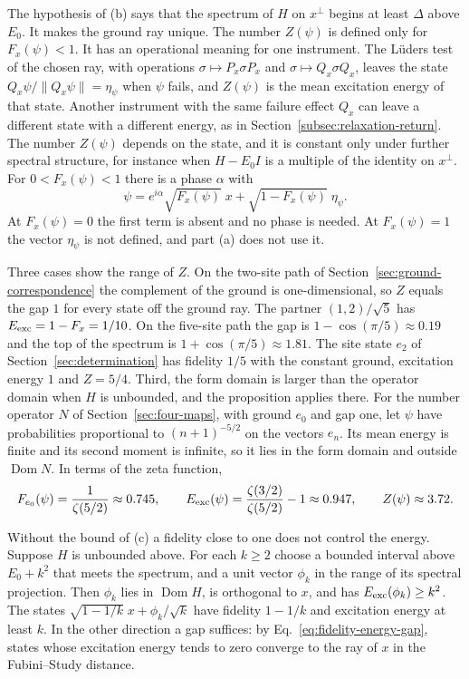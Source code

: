 \documentclass[11pt]{article}
\theoremstyle{definition}
\begin{document}
The hypothesis of (b) says that the spectrum of $H$ on $x^\perp$ begins at least $\Delta$ above $E_0$. It makes the ground ray unique. The number $Z(\psi)$ is defined only for $F_x(\psi)<1$. It has an operational meaning for one instrument. The L\"uders test of the chosen ray, with operations $\sigma\mapsto P_x\sigma P_x$ and $\sigma\mapsto Q_x\sigma Q_x$, leaves the state $Q_x\psi/\|Q_x\psi\|=\eta_\psi$ when $\psi$ fails, and $Z(\psi)$ is the mean excitation energy of that state. Another instrument with the same failure effect $Q_x$ can leave a different state with a different energy, as in Section~\ref{subsec:relaxation-return}. The number $Z(\psi)$ depends on the state, and it is constant only under further spectral structure, for instance when $H-E_0I$ is a multiple of the identity on $x^\perp$. For $0<F_x(\psi)<1$ there is a phase $\alpha$ with
\begin{equation}
 \psi=e^{i\alpha}\sqrt{F_x(\psi)}\;x+\sqrt{1-F_x(\psi)}\;\eta_\psi .
 \label{eq:fidelity-energy-decomposition}
\end{equation}
At $F_x(\psi)=0$ the first term is absent and no phase is needed. At $F_x(\psi)=1$ the vector $\eta_\psi$ is not defined, and part (a) does not use it.

Three cases show the range of $Z$. On the two-site path of Section~\ref{sec:ground-correspondence} the complement of the ground is one-dimensional, so $Z$ equals the gap $1$ for every state off the ground ray. The partner $(1,2)/\sqrt5$ has $E_{\rm exc}=1-F_x=1/10$. On the five-site path the gap is $1-\cos(\pi/5)\approx0.19$ and the top of the spectrum is $1+\cos(\pi/5)\approx1.81$. The site state $e_2$ of Section~\ref{sec:determination} has fidelity $1/5$ with the constant ground, excitation energy $1$ and $Z=5/4$. Third, the form domain is larger than the operator domain when $H$ is unbounded, and the proposition applies there. For the number operator $N$ of Section~\ref{sec:four-maps}, with ground $e_0$ and gap one, let $\psi$ have probabilities proportional to $(n+1)^{-5/2}$ on the vectors $e_n$. Its mean energy is finite and its second moment is infinite, so it lies in the form domain and outside $\operatorname{Dom}N$. In terms of the zeta function,
\begin{equation}
 F_{e_0}(\psi)=\frac1{\zeta(5/2)}\approx0.745,\qquad
 E_{\rm exc}(\psi)=\frac{\zeta(3/2)}{\zeta(5/2)}-1\approx0.947,\qquad Z(\psi)\approx3.72 .
 \label{eq:fidelity-energy-oscillator}
\end{equation}

Without the bound of (c) a fidelity close to one does not control the energy. Suppose $H$ is unbounded above. For each $k\ge2$ choose a bounded interval above $E_0+k^2$ that meets the spectrum, and a unit vector $\phi_k$ in the range of its spectral projection. Then $\phi_k$ lies in $\operatorname{Dom}H$, is orthogonal to $x$, and has $E_{\rm exc}(\phi_k)\ge k^2$. The states $\sqrt{1-1/k}\;x+\phi_k/\sqrt k$ have fidelity $1-1/k$ and excitation energy at least $k$. In the other direction a gap suffices: by Eq.~\eqref{eq:fidelity-energy-gap}, states whose excitation energy tends to zero converge to the ray of $x$ in the Fubini--Study distance.
\end{document}
